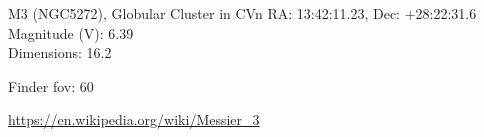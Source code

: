 \begin{block}{M3 (NGC5272), Globular Cluster in CVn}
    RA: 13:42:11.23, Dec: +28:22:31.6 \\ 
    Magnitude (V): 6.39 \\ 
    Dimensions: 16.2 

    Finder fov: 60 

    \url{https://en.wikipedia.org/wiki/Messier_3} 
\end{block}